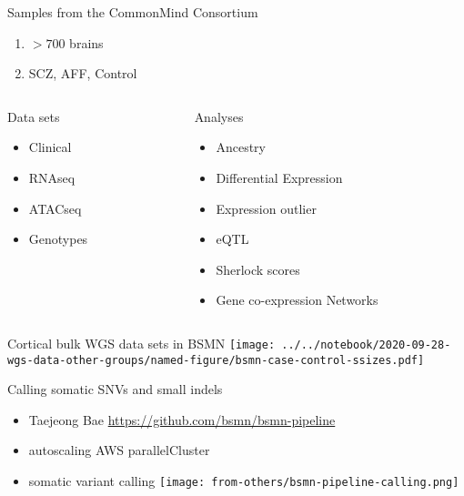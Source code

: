 \documentclass{beamer}
\begin{document}
\begin{frame}{Samples from the CommonMind Consortium}
\begin{enumerate}
\item \(> 700\) brains
\item SCZ, AFF, Control
\end{enumerate}
\vfill
\begin{columns}[t]
\begin{column}{0.5\textwidth}
Data sets
\begin{itemize}
\item Clinical
\item RNAseq
\item ATACseq
\item Genotypes
\end{itemize}
\end{column}

\begin{column}{0.5\textwidth}
Analyses
\begin{itemize}
\item Ancestry
\item Differential Expression
\item Expression outlier
\item eQTL
\item Sherlock scores
\item Gene co-expression Networks
\end{itemize}
\end{column}
\end{columns}

\end{frame}

\begin{frame}{Cortical bulk WGS data sets in BSMN}
\texttt{[image: ../../notebook/2020-09-28-wgs-data-other-groups/named-figure/bsmn-case-control-ssizes.pdf]}
\end{frame}

\begin{frame}{Calling somatic SNVs and small indels}
\begin{itemize}
\item Taejeong Bae \url{https://github.com/bsmn/bsmn-pipeline}
\item autoscaling AWS parallelCluster
\item somatic variant calling
\texttt{[image: from-others/bsmn-pipeline-calling.png]}
\end{itemize}
\end{frame}
\end{document}
